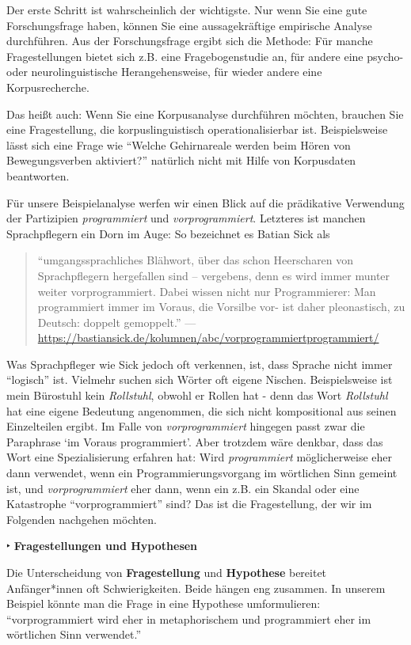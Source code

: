 \documentclass[]{article}
\begin{document}
Der erste Schritt ist wahrscheinlich der wichtigste. Nur wenn Sie eine
gute Forschungsfrage haben, können Sie eine aussagekräftige empirische
Analyse durchführen. Aus der Forschungsfrage ergibt sich die Methode:
Für manche Fragestellungen bietet sich z.B. eine Fragebogenstudie an,
für andere eine psycho- oder neurolinguistische Herangehensweise, für
wieder andere eine Korpusrecherche.

Das heißt auch: Wenn Sie eine Korpusanalyse durchführen möchten,
brauchen Sie eine Fragestellung, die korpuslinguistisch
operationalisierbar ist. Beispielsweise lässt sich eine Frage wie
``Welche Gehirnareale werden beim Hören von Bewegungsverben aktiviert?''
natürlich nicht mit Hilfe von Korpusdaten beantworten.

Für unsere Beispielanalyse werfen wir einen Blick auf die prädikative
Verwendung der Partizipien \emph{programmiert} und
\emph{vorprogrammiert}. Letzteres ist manchen Sprachpflegern ein Dorn im
Auge: So bezeichnet es Batian Sick als

\begin{quote}
``umgangssprachliches Blähwort, über das schon Heerscharen von
Sprachpflegern hergefallen sind -- vergebens, denn es wird immer munter
weiter vorprogrammiert. Dabei wissen nicht nur Programmierer: Man
programmiert immer im Voraus, die Vorsilbe vor- ist daher pleonastisch,
zu Deutsch: doppelt gemoppelt.'' \hfill ---
\url{https://bastiansick.de/kolumnen/abc/vorprogrammiertprogrammiert/}
\end{quote}

Was Sprachpfleger wie Sick jedoch oft verkennen, ist, dass Sprache nicht
immer ``logisch'' ist. Vielmehr suchen sich Wörter oft eigene Nischen.
Beispielsweise ist mein Bürostuhl kein \emph{Rollstuhl}, obwohl er
Rollen hat - denn das Wort \emph{Rollstuhl} hat eine eigene Bedeutung
angenommen, die sich nicht kompositional aus seinen Einzelteilen ergibt.
Im Falle von \emph{vorprogrammiert} hingegen passt zwar die Paraphrase
`im Voraus programmiert'. Aber trotzdem wäre denkbar, dass das Wort eine
Spezialisierung erfahren hat: Wird \emph{programmiert} möglicherweise
eher dann verwendet, wenn ein Programmierungsvorgang im wörtlichen Sinn
gemeint ist, und \emph{vorprogrammiert} eher dann, wenn ein z.B. ein
Skandal oder eine Katastrophe ``vorprogrammiert'' sind? Das ist die
Fragestellung, der wir im Folgenden nachgehen möchten.

 ‣ \textbf{Fragestellungen und Hypothesen}

Die Unterscheidung von \textbf{Fragestellung} und \textbf{Hypothese}
bereitet Anfänger*innen oft Schwierigkeiten. Beide hängen eng zusammen.
In unserem Beispiel könnte man die Frage in eine Hypothese
umformulieren: ``vorprogrammiert wird eher in metaphorischem und
programmiert eher im wörtlichen Sinn verwendet.''
\end{document}

